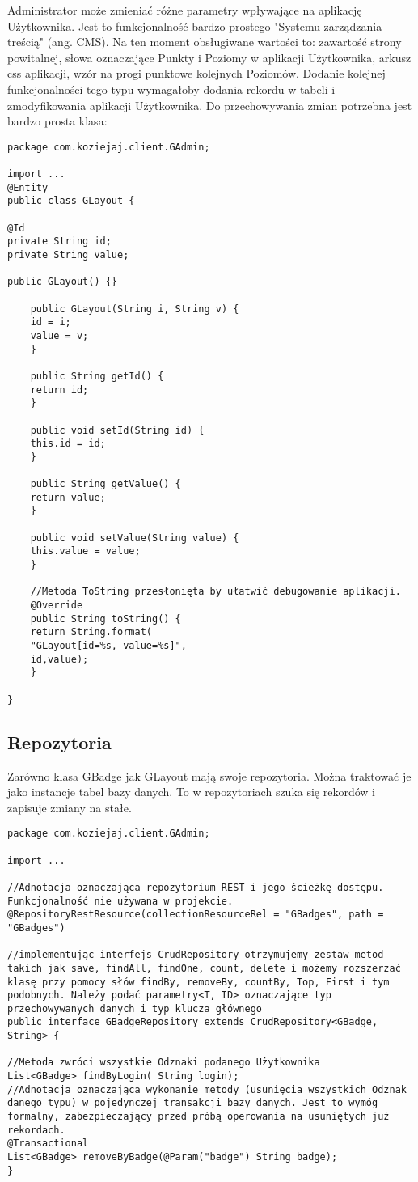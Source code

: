 \documentclass[a4paper,12pt,twoside,openany]{report}
\begin{document}
Administrator może zmieniać różne parametry wpływające na aplikację Użytkownika. Jest to funkcjonalność bardzo prostego "Systemu zarządzania treścią" (ang. CMS). Na ten moment obsługiwane wartości to: zawartość strony powitalnej, słowa oznaczające Punkty i Poziomy w aplikacji Użytkownika, arkusz css aplikacji, wzór na progi punktowe kolejnych Poziomów. Dodanie kolejnej funkcjonalności tego typu wymagałoby dodania rekordu w tabeli i zmodyfikowania aplikacji Użytkownika. Do przechowywania zmian potrzebna jest bardzo prosta klasa: 
\begin{lstlisting}
package com.koziejaj.client.GAdmin;

import ...
@Entity
public class GLayout {

@Id
private String id;
private String value;

public GLayout() {}

	public GLayout(String i, String v) {
	id = i;
	value = v;
	}

	public String getId() {
	return id;
	}

	public void setId(String id) {
	this.id = id;
	}

	public String getValue() {
	return value;
	}

	public void setValue(String value) {
	this.value = value;
	}
	
	//Metoda ToString przesłonięta by ułatwić debugowanie aplikacji.
	@Override
	public String toString() {
	return String.format(
	"GLayout[id=%s, value=%s]",
	id,value);
	}

}

\end{lstlisting}
\subsection{Repozytoria}
Zarówno klasa GBadge jak GLayout mają swoje repozytoria. Można traktować je jako instancje tabel bazy danych. To w repozytoriach szuka się rekordów i zapisuje zmiany na stałe.
\begin{lstlisting}
package com.koziejaj.client.GAdmin;

import ...

//Adnotacja oznaczająca repozytorium REST i jego ścieżkę dostępu. Funkcjonalność nie używana w projekcie.
@RepositoryRestResource(collectionResourceRel = "GBadges", path = "GBadges")

//implementując interfejs CrudRepository otrzymujemy zestaw metod takich jak save, findAll, findOne, count, delete i możemy rozszerzać klasę przy pomocy słów findBy, removeBy, countBy, Top, First i tym podobnych. Należy podać parametry<T, ID> oznaczające typ przechowywanych danych i typ klucza głównego
public interface GBadgeRepository extends CrudRepository<GBadge, String> {

//Metoda zwróci wszystkie Odznaki podanego Użytkownika
List<GBadge> findByLogin( String login);
//Adnotacja oznaczająca wykonanie metody (usunięcia wszystkich Odznak danego typu) w pojedynczej transakcji bazy danych. Jest to wymóg formalny, zabezpieczający przed próbą operowania na usuniętych już rekordach.
@Transactional
List<GBadge> removeByBadge(@Param("badge") String badge);
}
\end{lstlisting}
\end{document}
